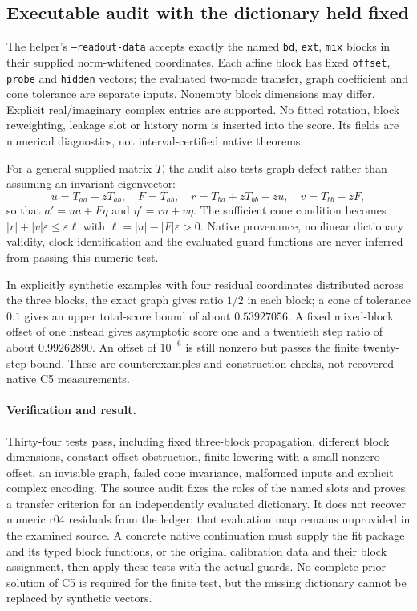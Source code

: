 \documentclass[11pt,a4paper]{article}
\begin{document}
\subsection{Executable audit with the dictionary held fixed}

The helper's \texttt{--readout-data} accepts exactly the named
\texttt{bd}, \texttt{ext}, \texttt{mix} blocks in their supplied
norm-whitened coordinates. Each affine block has fixed
\texttt{offset}, \texttt{probe} and \texttt{hidden} vectors;
the evaluated two-mode transfer, graph coefficient and cone
tolerance are separate inputs. Nonempty block dimensions may
differ. Explicit real/imaginary complex entries are supported.
No fitted rotation, block reweighting, leakage slot or history
norm is inserted into the score. Its fields are numerical
diagnostics, not interval-certified native theorems.

For a general supplied matrix $T$, the audit also tests graph
defect rather than assuming an invariant eigenvector:
\[
 u=T_{aa}+zT_{ab},\quad F=T_{ab},\quad
 r=T_{ba}+zT_{bb}-zu,\quad v=T_{bb}-zF,
\]
so that $a'=ua+F\eta$ and $\eta'=ra+v\eta$.
The sufficient cone condition becomes
$|r|+|v|\varepsilon\leq\varepsilon\ell$ with
$\ell=|u|-|F|\varepsilon>0$.
Native provenance, nonlinear dictionary validity, clock
identification and the evaluated guard functions are never
inferred from passing this numeric test.

In explicitly synthetic examples with four residual coordinates
distributed across the three blocks, the exact graph gives
ratio $1/2$ in each block; a cone of tolerance $0.1$ gives
an upper total-score bound of about $0.53927056$.
A fixed mixed-block offset of one instead gives asymptotic score
one and a twentieth step ratio of about $0.99262890$.
An offset of $10^{-6}$ is still nonzero but passes the finite
twenty-step bound. These are counterexamples and construction
checks, not recovered native C5 measurements.

\paragraph{Verification and result.}
Thirty-four tests pass, including fixed three-block propagation,
different block dimensions, constant-offset obstruction, finite
lowering with a small nonzero offset, an invisible graph,
failed cone invariance, malformed inputs and explicit complex
encoding. The source audit fixes the roles of the named slots
and proves a transfer criterion for an independently evaluated
dictionary. It does not recover numeric r04 residuals from the
ledger: that evaluation map remains unprovided in the examined
source. A concrete native continuation must supply the fit
package and its typed block functions, or the original calibration
data and their block assignment, then apply these tests with
the actual guards. No complete prior solution of C5 is required
for the finite test, but the missing dictionary cannot be
replaced by synthetic vectors.
\end{document}
